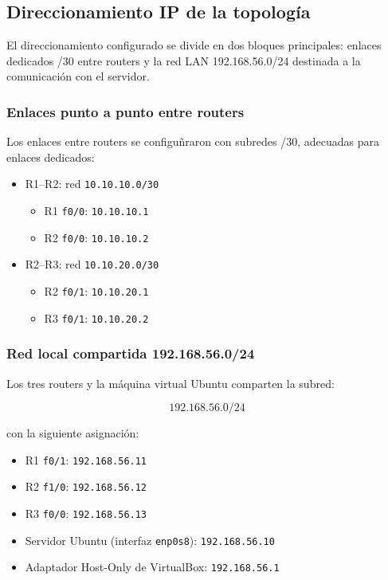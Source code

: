 \subsection*{Direccionamiento IP de la topología}

El direccionamiento configurado se divide en dos bloques principales: enlaces dedicados /30 entre routers y la red LAN 192.168.56.0/24 destinada a la comunicación con el servidor.

\subsubsection*{Enlaces punto a punto entre routers}

Los enlaces entre routers se configuñraron con subredes /30, adecuadas para enlaces dedicados:

\begin{itemize}
    \item R1–R2: red \texttt{10.10.10.0/30}
    \begin{itemize}
        \item R1 \texttt{f0/0}: \texttt{10.10.10.1}
        \item R2 \texttt{f0/0}: \texttt{10.10.10.2}
    \end{itemize}

    \item R2–R3: red \texttt{10.10.20.0/30}
    \begin{itemize}
        \item R2 \texttt{f0/1}: \texttt{10.10.20.1}
        \item R3 \texttt{f0/1}: \texttt{10.10.20.2}
    \end{itemize}
\end{itemize}

\subsubsection*{Red local compartida 192.168.56.0/24}

Los tres routers y la máquina virtual Ubuntu comparten la subred:

\[
192.168.56.0/24
\]

con la siguiente asignación:

\begin{itemize}
    \item R1 \texttt{f0/1}: \texttt{192.168.56.11}
    \item R2 \texttt{f1/0}: \texttt{192.168.56.12}
    \item R3 \texttt{f0/0}: \texttt{192.168.56.13}
    \item Servidor Ubuntu (interfaz \texttt{enp0s8}): \texttt{192.168.56.10}
    \item Adaptador Host-Only de VirtualBox: \texttt{192.168.56.1}
\end{itemize}

